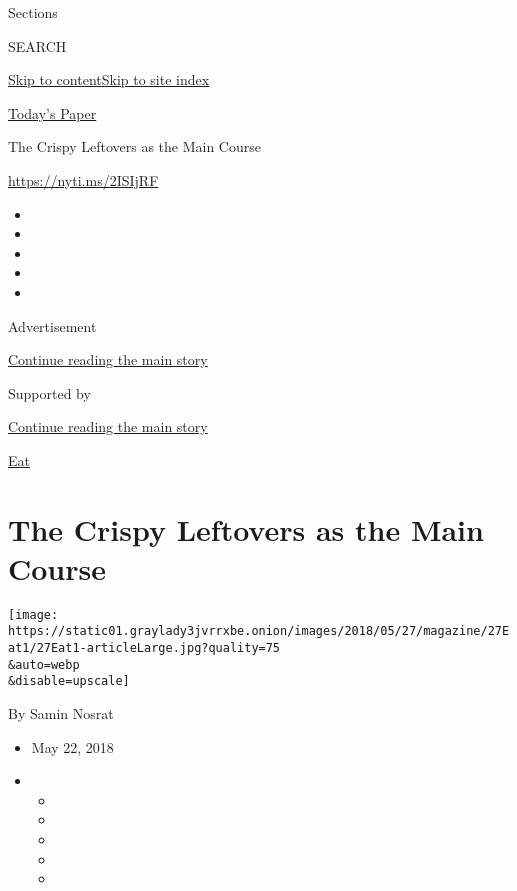 Sections

SEARCH

\protect\hyperlink{site-content}{Skip to
content}\protect\hyperlink{site-index}{Skip to site index}

\href{https://myaccount.nytimes3xbfgragh.onion/auth/login?response_type=cookie\&client_id=vi}{}

\href{https://www.nytimes3xbfgragh.onion/section/todayspaper}{Today's
Paper}

The Crispy Leftovers as the Main Course

\url{https://nyti.ms/2ISIjRF}

\begin{itemize}
\item
\item
\item
\item
\item
\end{itemize}

Advertisement

\protect\hyperlink{after-top}{Continue reading the main story}

Supported by

\protect\hyperlink{after-sponsor}{Continue reading the main story}

\href{/column/magazine-eat}{Eat}

\hypertarget{the-crispy-leftovers-as-the-main-course}{%
\section{The Crispy Leftovers as the Main
Course}\label{the-crispy-leftovers-as-the-main-course}}

\texttt{[image: https://static01.graylady3jvrrxbe.onion/images/2018/05/27/magazine/27Eat1/27Eat1-articleLarge.jpg?quality=75\\\&auto=webp\\\&disable=upscale]}

By Samin Nosrat

\begin{itemize}
\item
  May 22, 2018
\item
  \begin{itemize}
  \item
  \item
  \item
  \item
  \item
  \end{itemize}
\end{itemize}

